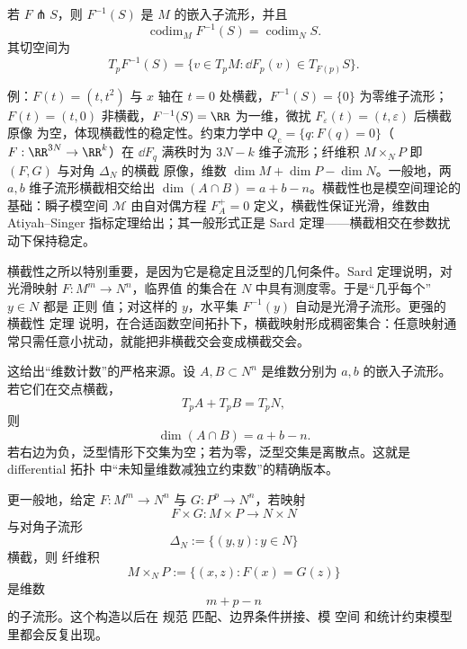 \begin{theorem}[原像定理]\label{thm:math-dg-preimage-transverse}
若 $F\pitchfork S$，则 $F^{-1}(S)$ 是 $M$ 的嵌入子流形，并且
\begin{equation}
\operatorname{codim}_M F^{-1}(S)
=\operatorname{codim}_N S.
\label{eq:math-dg-transverse-codimension}
\end{equation}
其切空间为
\begin{equation}
T_pF^{-1}(S)
=\{v\in T_pM:\dd F_p(v)\in T_{F(p)}S\}.
\label{eq:math-dg-transverse-tangent-space}
\end{equation}
\end{theorem}

例：$F(t)=(t,t^2)$ 与 $x$ 轴在 $t=0$ 处横截，$F^{-1}(S)=\{0\}$ 为零维子流形；$F(t)=(t,0)$ 非横截，$F^{-1}(S)=\RR$ 为一维，微扰 $F_\varepsilon(t)=(t,\varepsilon)$ 后横截 原像 为空，体现横截性的稳定性。约束力学中 $Q_{\mathrm c}=\{q:F(q)=0\}$（$F:\RR^{3N}\to\RR^k$）在 $\dd F_q$ 满秩时为 $3N-k$ 维子流形；纤维积 $M\times_NP$ 即 $(F,G)$ 与对角 $\Delta_N$ 的横截 原像，维数 $\dim M+\dim P-\dim N$。一般地，两 $a,b$ 维子流形横截相交给出 $\dim(A\cap B)=a+b-n$。横截性也是模空间理论的基础：瞬子模空间 $\mathcal M$ 由自对偶方程 $F_A^+=0$ 定义，横截性保证光滑，维数由 Atiyah--Singer 指标定理给出；其一般形式正是 Sard 定理——横截相交在参数扰动下保持稳定。

横截性之所以特别重要，是因为它是稳定且泛型的几何条件。Sard 定理说明，对光滑映射 $F:M^m\to N^n$，临界值 的集合在 $N$ 中具有测度零。于是“几乎每个” $y\in N$ 都是 正则 值；对这样的 $y$，水平集 $F^{-1}(y)$ 自动是光滑子流形。更强的 横截性 定理 说明，在合适函数空间拓扑下，横截映射形成稠密集合：任意映射通常只需任意小扰动，就能把非横截交会变成横截交会。

这给出“维数计数”的严格来源。设 $A,B\subset N^n$ 是维数分别为 $a,b$ 的嵌入子流形。若它们在交点横截，
\[
T_pA+T_pB=T_pN,
\]
则
\begin{equation*}\dim(A\cap B)=a+b-n.\end{equation*}
若右边为负，泛型情形下交集为空；若为零，泛型交集是离散点。这就是 differential 拓扑 中“未知量维数减独立约束数”的精确版本。

更一般地，给定 $F:M^m\to N^n$ 与 $G:P^p\to N^n$，若映射
\[
F\times G:M\times P\to N\times N
\]
与对角子流形
\[
\Delta_N:=\{(y,y):y\in N\}
\]
横截，则 纤维积
\begin{equation*}M\times_NP
:=\{(x,z):F(x)=G(z)\}\end{equation*}
是维数
\[
m+p-n
\]
的子流形。这个构造以后在 规范 匹配、边界条件拼接、模 空间 和统计约束模型里都会反复出现。

